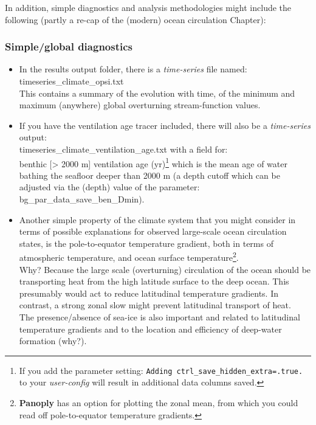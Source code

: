 \vspace{1mm}
In addition, simple diagnostics and analysis methodologies might include the following (partly a re-cap of the (modern) ocean circulation Chapter):


\subsubsection{Simple/global diagnostics}

\vspace{1pt}
\begin{itemize}[noitemsep]
\vspace{1mm}
\item In the \textsf{\footnotesize results} output folder, there is a \textit{time-series} file named: \\\textsf{\footnotesize timeseries\_climate\_opsi.txt} \\This contains a summary of the evolution with time, of the minimum and maximum (anywhere) global overturning stream-function values.
\vspace{1mm}
\item If you have the ventilation age tracer included, there will also be a \textit{time-series} output:  \\\textsf{\footnotesize timeseries\_climate\_ventilation\_age.txt} with a field for: 
\\\textsf{\footnotesize benthic [> 2000 m] ventilation age (yr)}\footnote{If you add the parameter setting: \texttt{\small Adding ctrl\_save\_hidden\_extra=.true.} to your \textit{user-config} will result in additional data columns saved.} which is the mean age of water bathing the seafloor deeper than 2000 m (a depth cutoff which can be adjusted via the (depth) value of the parameter: \textsf{\footnotesize bg\_par\_data\_save\_ben\_Dmin}).
\vspace{1mm}
\item Another simple property of the climate system that you might consider in terms of possible explanations for observed large-scale ocean circulation states, is the pole-to-equator temperature gradient, both in terms of atmospheric temperature, and ocean surface temperature\footnote{\textbf{Panoply} has an option for plotting the zonal mean, from which you could read off pole-to-equator temperature gradients.}.
\\Why? Because the large scale (overturning) circulation of the ocean should be transporting heat from the high latitude surface to the deep ocean. This presumably would act to reduce latitudinal temperature gradients. In contrast, a strong zonal slow might prevent latitudinal transport of heat.
\\The presence/absence of sea-ice is also important and related to latitudinal temperature gradients and to the location and efficiency of deep-water formation (why?). 
\end{itemize}

